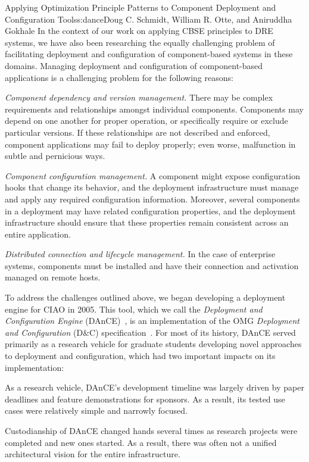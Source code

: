 \begin{aosachapter}{Applying Optimization Principle Patterns to Component Deployment and
                    Configuration Tools}{s:dance}{Doug C. Schmidt, William R. Otte, and Aniruddha Gokhale}
In the context of our work on applying CBSE principles to DRE systems,
we have also been researching the equally challenging problem of
facilitating deployment and configuration of component-based systems in
these domains. Managing deployment and configuration of component-based
applications is a challenging problem for the following reasons:

\begin{aosaitemize}
\item
  \emph{Component dependency and version management.} There may be
  complex requirements and relationships amongst individual components.
  Components may depend on one another for proper operation, or
  specifically require or exclude particular versions. If these
  relationships are not described and enforced, component applications
  may fail to deploy properly; even worse, malfunction in subtle and
  pernicious ways.
\item
  \emph{Component configuration management.} A component might expose
  configuration hooks that change its behavior, and the deployment
  infrastructure must manage and apply any required configuration
  information. Moreover, several components in a deployment may have
  related configuration properties, and the deployment infrastructure
  should ensure that these properties remain consistent across an entire
  application.
\item
  \emph{Distributed connection and lifecycle management.} In the case of
  enterprise systems, components must be installed and have their
  connection and activation managed on remote hosts.
\end{aosaitemize}

To address the challenges outlined above, we began developing a
deployment engine for CIAO in 2005. This tool, which we call the
\emph{Deployment and Configuration Engine} (DAnCE)~\cite{Schmidt:05y},
is an implementation of the OMG \emph{Deployment and Configuration}
(D\&C) specification~\cite{DandC:06}. For most of its history, DAnCE
served primarily as a research vehicle for graduate students developing
novel approaches to deployment and configuration, which had two
important impacts on its implementation:

\begin{aosaitemize}
\item
  As a research vehicle, DAnCE's development timeline was largely driven
  by paper deadlines and feature demonstrations for sponsors. As a
  result, its tested use cases were relatively simple and narrowly
  focused.
\item
  Custodianship of DAnCE changed hands several times as research
  projects were completed and new ones started. As a result, there was
  often not a unified architectural vision for the entire
  infrastructure.
\end{aosaitemize}


\end{aosachapter}
